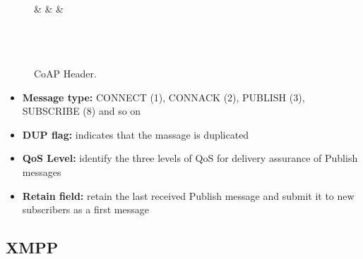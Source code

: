 \begin{figure}[h]
	\footnotesize
	\centering
	\begin{bytefield}[bitwidth=4em]{8}
		                                                     \\
		 &  &  &   \\
		                                                        \\
		                                                      \\
		                                     \\
	\end{bytefield}
\caption{CoAP Header.}\label{fig:2g}
\end{figure}


\begin{itemize}
\item \textbf{Message type:}  CONNECT (1), CONNACK (2), PUBLISH (3), SUBSCRIBE (8) and so on
\item \textbf{DUP flag:}  indicates that the massage is duplicated
\item \textbf{QoS Level:} identify the three levels of QoS for delivery assurance of Publish messages
\item \textbf{Retain field:}  retain the last received Publish message and submit it to new subscribers as a first message
\end{itemize}

\subsection{XMPP}


